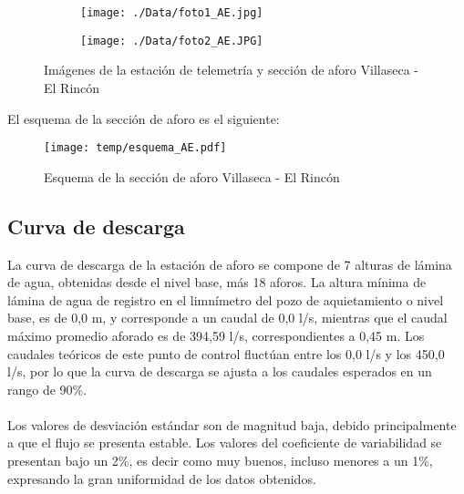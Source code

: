 \documentclass[]{article}
\begin{document}
\begin{figure}[H]
  \centering
\begin{subfigure}{.49\textwidth}
  \texttt{[image: ./Data/foto1\_AE.jpg]}
\end{subfigure}
\hfill
\begin{subfigure}{.49\textwidth}
  \texttt{[image: ./Data/foto2\_AE.JPG]}
\end{subfigure}
\caption{Imágenes de la estación de telemetría y sección de aforo Villaseca - El Rincón}
\label{fig:fotos_5}
\end{figure}

El esquema de la sección de aforo es el siguiente:

\begin{figure}[H]
  \centering
  \texttt{[image: temp/esquema\_AE.pdf]}
\caption{Esquema de la sección de aforo Villaseca - El Rincón}
\label{fig:Esquema_AE}
\end{figure}

\subsection{Curva de descarga}\label{curva-de-descarga-4}

La curva de descarga de la estación de aforo se compone de 7 alturas de lámina de agua, obtenidas desde el nivel base, más 18 aforos. La altura mínima de lámina de agua de registro en el limnímetro del pozo de aquietamiento o nivel base, es de 0,0 m, y corresponde a un caudal de 0,0 l/s, mientras que el caudal máximo promedio aforado es de 394,59 l/s, correspondientes a 0,45 m. Los caudales teóricos de este punto de control fluctúan entre los 0,0 l/s y los 450,0 l/s, por lo que la curva de descarga se ajusta a los caudales esperados en un rango de 90\%.\\
\\
Los valores de desviación estándar son de magnitud baja, debido principalmente a que el flujo se presenta estable. Los valores del coeficiente de variabilidad se presentan bajo un 2\%, es decir como muy buenos, incluso menores a un 1\%, expresando la gran uniformidad de los datos obtenidos. 
\end{document}
